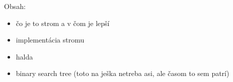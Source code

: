 




Obsah:
\begin{itemize}
    \item čo je to strom a v čom je lepší
    \item implementácia stromu
    \item halda
    \item binary search tree (toto na ješka netreba asi, ale časom to sem patrí)
\end{itemize}


